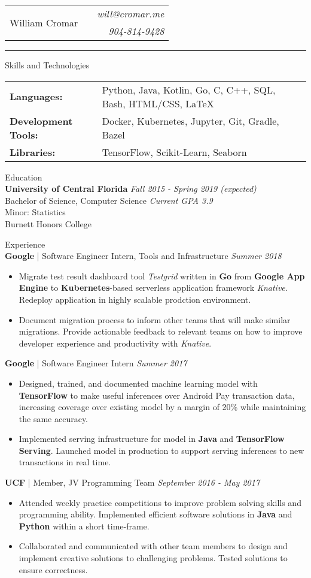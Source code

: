 \documentclass[letterpaper,11pt,oneside]{article}
\newcommand{\mkheader}[3]{
  {\fontfamily{pag}\selectfont
  \begin{tabularx}{\textwidth}{lXr}
    \multirow{2}{*}{\Huge #1} && \emph{#2}
    \\ && \emph{#3}
  \end{tabularx}
  }
  \vspace{2pt}
  \hrule
}
\newcommand{\resheader}[2][]{
  \vspace{9pt}
  {\LARGE #2} #1
  \\
}
\newcommand{\ressubheader}[3][]{
  \vspace{6pt}
  {\large \textbf{#2} #1} \hfill \emph{#3}
  \\
}
\newcommand{\resskill}[1]{\textbf{#1}}
\begin{document}
\mkheader{William Cromar}{will@cromar.me}{904-814-9428}

\resheader{Skills and Technologies}
\vspace{6pt}
\begin{tabular}{>{\bfseries}l@{\hskip .25cm} l}
  Languages: & Python, Java, Kotlin, Go, C, C++, SQL, Bash, HTML/CSS, LaTeX \\
  Development Tools: & Docker, Kubernetes, Jupyter, Git, Gradle, Bazel \\
  Libraries: & TensorFlow, Scikit-Learn, Seaborn
\end{tabular}


\resheader{Education}
\ressubheader{University of Central Florida}{Fall 2015 - Spring 2019 (expected)}
Bachelor of Science, Computer Science \hfill \emph{Current GPA 3.9} \\
Minor: Statistics \\
Burnett Honors College

\resheader{Experience}
\ressubheader[| Software Engineer Intern, Tools and Infrastructure]{Google}{Summer 2018}
\begin{itemize}
  \item Migrate test result dashboard tool \emph{Testgrid} written in \resskill{Go} from \resskill{Google App Engine} to \resskill{Kubernetes}-based serverless application framework \emph{Knative}. Redeploy application in highly scalable prodction environment.
  \item Document migration process to inform other teams that will make similar migrations. Provide actionable feedback to relevant teams on how to improve developer experience and productivity with \emph{Knative}.
\end{itemize}

\ressubheader[| Software Engineer Intern]{Google}{Summer 2017}
\begin{itemize}
  \item Designed, trained, and documented machine learning model with \resskill{TensorFlow} to make useful inferences over Android Pay transaction data, increasing coverage over existing model by a margin of 20\% while maintaining the same accuracy.
  \item Implemented serving infrastructure for model in \resskill{Java} and \resskill{TensorFlow Serving}. Launched model in production to support serving inferences to new transactions in real time.
\end{itemize}

\ressubheader[| Member, JV Programming Team]{UCF}{September 2016 - May 2017}
\begin{itemize}
  \item Attended weekly practice competitions to improve problem solving skills and programming ability. Implemented efficient software solutions in \resskill{Java} and \resskill{Python} within a short time-frame. 
  \item Collaborated and communicated with other team members to design and implement creative solutions to challenging problems. Tested solutions to ensure correctness.
\end{itemize}
\end{document}
